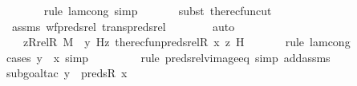 \begin{isabellebody}
\ \ \ \ \ \ \isamarkupfalse%
{\isacharparenleft}{\kern0pt}rule\ lam{\isacharunderscore}{\kern0pt}cong{\isacharcomma}{\kern0pt}\ simp{\isacharparenright}{\kern0pt}\isanewline
\ \ \ \ \ \ \isamarkupfalse%
{\isacharparenleft}{\kern0pt}subst\ the{\isacharunderscore}{\kern0pt}recfun{\isacharunderscore}{\kern0pt}cut{\isacharparenright}{\kern0pt}\isanewline
\ \ \ \ \ \ \isamarkupfalse%
\ assms\ wf{\isacharunderscore}{\kern0pt}preds{\isacharunderscore}{\kern0pt}rel\ trans{\isacharunderscore}{\kern0pt}preds{\isacharunderscore}{\kern0pt}rel\isanewline
\ \ \ \ \ \ \isamarkupfalse%
\ auto\isanewline
\ \ \ \ \isamarkupfalse%
\ \isamarkupfalse%
\ {\isachardoublequoteopen}{\isachardot}{\kern0pt}{\isachardot}{\kern0pt}{\isachardot}{\kern0pt}\ {\isacharequal}{\kern0pt}\ {\isacharparenleft}{\kern0pt}{\isasymlambda}z{\isasymin}Rrel{\isacharparenleft}{\kern0pt}R{\isacharcomma}{\kern0pt}\ M{\isacharparenright}{\kern0pt}\ {\isacharminus}{\kern0pt}{\isacharbackquote}{\kern0pt}{\isacharbackquote}{\kern0pt}\ {\isacharbraceleft}{\kern0pt}y{\isacharbraceright}{\kern0pt}{\isachardot}{\kern0pt}\ H{\isacharparenleft}{\kern0pt}z{\isacharcomma}{\kern0pt}\ the{\isacharunderscore}{\kern0pt}recfun{\isacharparenleft}{\kern0pt}preds{\isacharunderscore}{\kern0pt}rel{\isacharparenleft}{\kern0pt}R{\isacharcomma}{\kern0pt}\ x{\isacharparenright}{\kern0pt}{\isacharcomma}{\kern0pt}\ z{\isacharcomma}{\kern0pt}\ H{\isacharparenright}{\kern0pt}{\isacharparenright}{\kern0pt}{\isacharparenright}{\kern0pt}{\isachardoublequoteclose}\isanewline
\ \ \ \ \ \ \isamarkupfalse%
{\isacharparenleft}{\kern0pt}rule\ lam{\isacharunderscore}{\kern0pt}cong{\isacharparenright}{\kern0pt}\isanewline
\ \ \ \ \ \ \ \isamarkupfalse%
{\isacharparenleft}{\kern0pt}cases\ {\isachardoublequoteopen}y\ {\isacharequal}{\kern0pt}\ x{\isachardoublequoteclose}{\isacharcomma}{\kern0pt}\ simp{\isacharparenright}{\kern0pt}\isanewline
\ \ \ \ \ \ \ \ \isamarkupfalse%
{\isacharparenleft}{\kern0pt}rule\ preds{\isacharunderscore}{\kern0pt}rel{\isacharunderscore}{\kern0pt}vimage{\isacharunderscore}{\kern0pt}eq{\isacharprime}{\kern0pt}{\isacharcomma}{\kern0pt}\ simp\ add{\isacharcolon}{\kern0pt}assms{\isacharparenright}{\kern0pt}\isanewline
\ \ \ \ \ \ \ \isamarkupfalse%
{\isacharparenleft}{\kern0pt}subgoal{\isacharunderscore}{\kern0pt}tac\ {\isachardoublequoteopen}y\ {\isasymin}\ preds{\isacharparenleft}{\kern0pt}R{\isacharcomma}{\kern0pt}\ x{\isacharparenright}{\kern0pt}{\isachardoublequoteclose}{\isacharparenright}{\kern0pt}\isanewline

\end{isabellebody}
